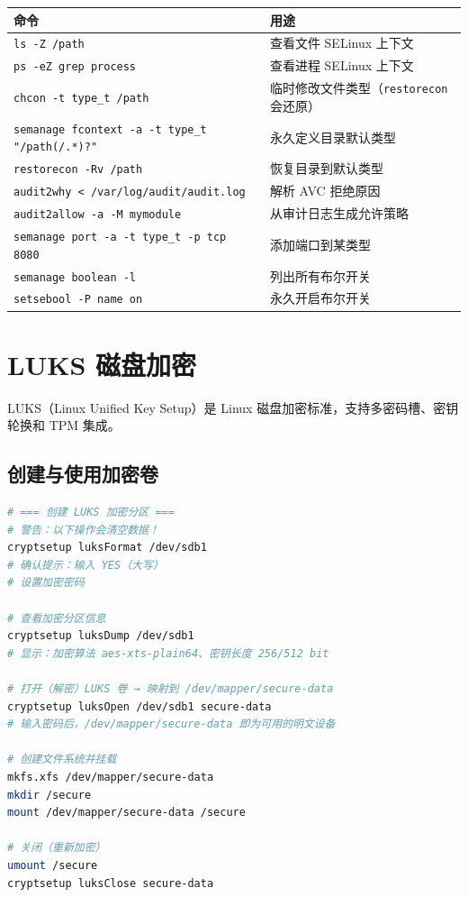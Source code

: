 \documentclass[12pt,UTF8]{ctexbook}
\begin{document}
\begin{tabular}{|p{4.5cm}|p{5.5cm}|}
\hline
\textbf{命令} & \textbf{用途} \\
\hline
\texttt{ls -Z /path} & 查看文件 SELinux 上下文 \\
\hline
\texttt{ps -eZ \textbar{} grep process} & 查看进程 SELinux 上下文 \\
\hline
\texttt{chcon -t type\_t /path} & 临时修改文件类型（\texttt{restorecon} 会还原） \\
\hline
\texttt{semanage fcontext -a -t type\_t "/path(/.*)?"} & 永久定义目录默认类型 \\
\hline
\texttt{restorecon -Rv /path} & 恢复目录到默认类型 \\
\hline
\texttt{audit2why < /var/log/audit/audit.log} & 解析 AVC 拒绝原因 \\
\hline
\texttt{audit2allow -a -M mymodule} & 从审计日志生成允许策略 \\
\hline
\texttt{semanage port -a -t type\_t -p tcp 8080} & 添加端口到某类型 \\
\hline
\texttt{semanage boolean -l} & 列出所有布尔开关 \\
\hline
\texttt{setsebool -P name on} & 永久开启布尔开关 \\
\hline
\end{tabular}

\section{LUKS 磁盘加密}
\label{sec:luks}

LUKS（Linux Unified Key Setup）是 Linux 磁盘加密标准，支持多密码槽、密钥轮换和 TPM 集成。

\subsection{创建与使用加密卷}

\begin{lstlisting}[language=bash]
# === 创建 LUKS 加密分区 ===
# 警告：以下操作会清空数据！
cryptsetup luksFormat /dev/sdb1
# 确认提示：输入 YES（大写）
# 设置加密密码

# 查看加密分区信息
cryptsetup luksDump /dev/sdb1
# 显示：加密算法 aes-xts-plain64、密钥长度 256/512 bit

# 打开（解密）LUKS 卷 → 映射到 /dev/mapper/secure-data
cryptsetup luksOpen /dev/sdb1 secure-data
# 输入密码后，/dev/mapper/secure-data 即为可用的明文设备

# 创建文件系统并挂载
mkfs.xfs /dev/mapper/secure-data
mkdir /secure
mount /dev/mapper/secure-data /secure

# 关闭（重新加密）
umount /secure
cryptsetup luksClose secure-data
\end{lstlisting}
\end{document}
